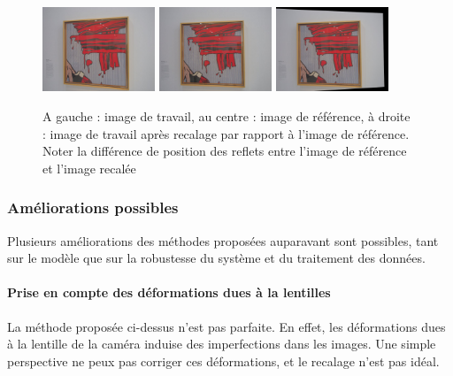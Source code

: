 \documentclass[12pt,a4paper]{article}
\begin{document}
\begin{figure}[H]
  \centering
  \includegraphics[width=0.30\textwidth]{Fig/working.png}
  \includegraphics[width=0.30\textwidth]{Fig/reference_image.png}
  \includegraphics[width=0.30\textwidth]{Fig/fitted.png}

  \caption{A gauche : image de travail, au centre : image de référence, à droite : image de travail après recalage par rapport à l'image de référence. Noter la différence de position des reflets entre l'image de référence et l'image recalée}
\end{figure}

\subsubsection{Améliorations possibles}

Plusieurs améliorations des méthodes proposées auparavant sont possibles, tant sur le modèle que sur la robustesse du système et du traitement des données.
\paragraph{Prise en compte des déformations dues à la lentilles}
La méthode proposée ci-dessus n'est pas parfaite. En effet, les déformations dues à la lentille de la caméra induise des imperfections dans les images. Une simple perspective ne peux pas corriger ces déformations, et le recalage n'est pas idéal.
\end{document}
